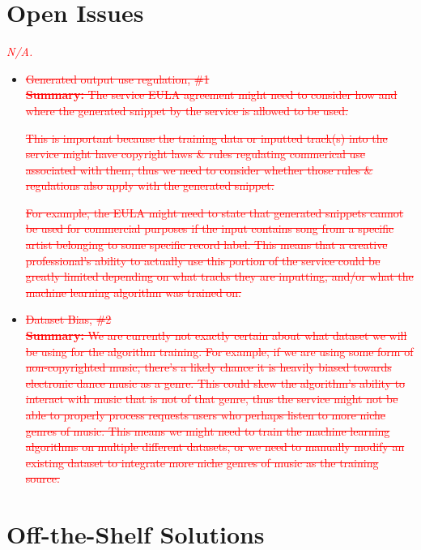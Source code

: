 \documentclass[12pt]{article}
\begin{document}
\section{Open Issues}
\textcolor{red}{\emph{N/A.}}
\begin{itemize}
  \item \textcolor{red}{\sout{Generated output use regulation, \#1}}
  \\\textcolor{red}{\sout{\textbf{Summary:} The service EULA agreement might need to consider how and where the generated snippet by the service is allowed
  to be used. }}
  
  \textcolor{red}{\sout{This is important because the training data or inputted track(s) into the service
  might have copyright laws \& rules regulating commerical use associated with them, thus we need to consider whether those rules \& regulations
   also apply with the generated snippet.  }}
  
  \textcolor{red}{\sout{For example, the EULA might need to state that generated snippets cannot be used for commercial purposes if the input contains song from a 
  specific artist belonging to some specific record label. This means that a creative professional's ability to actually use 
  this portion of the service could be greatly limited depending on what tracks they
  are inputting, and/or what the machine learning algorithm was trained on. }}

  \item\textcolor{red}{\sout{ Dataset Bias, \#2}}
  \\\textcolor{red}{\sout{\textbf{Summary:} We are currently not exactly certain about what dataset we will be using for the algorithm training. 
  For example, if we are using some form of non-copyrighted music, there's a likely chance it is heavily biased towards electronic dance 
  music as a genre. This could skew the algorithm's ability to interact with music that is not of that genre, thus the service 
  might not be able to properly process requests users who perhaps listen to more niche genres of music. This means we might need to train the 
  machine learning algorithms on multiple different datasets, or we need to manually modify an existing dataset to integrate more niche genres 
  of music as the training source. }}

\end{itemize}

\section{Off-the-Shelf Solutions}
\end{document}
